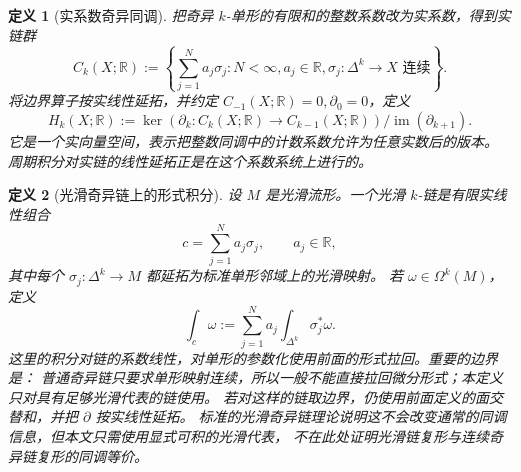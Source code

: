 \documentclass[UTF8,fontset=none,a4paper,11pt]{ctexart}
\theoremstyle{foundation-definition}
\newtheorem{definition}{定义}[section]
\theoremstyle{foundation-theorem}
\theoremstyle{foundation-proposition}
\theoremstyle{foundation-example}
\theoremstyle{foundation-remark}
\theoremstyle{foundation-theorem}
\begin{document}
\begin{definition}[实系数奇异同调]\label{def:real-homology}
把奇异 \(k\)-单形的有限和的整数系数改为实系数，得到实链群
\[
C_k(X;\mathbb R):=\left\{\sum_{j=1}^{N}a_j\sigma_j:
N<\infty, a_j\in\mathbb R, \sigma_j:\Delta^k\to X\text{ 连续}\right\}.
\]
将边界算子按实线性延拓，并约定 \(C_{-1}(X;\mathbb R)=0,\partial_0=0\)，定义
\[
H_k(X;\mathbb R):=\ker(\partial_k:C_k(X;\mathbb R)\to C_{k-1}(X;\mathbb R))
\big/\operatorname{im}(\partial_{k+1}).
\]
它是一个实向量空间，表示把整数同调中的计数系数允许为任意实数后的版本。
周期积分对实链的线性延拓正是在这个系数系统上进行的。
\end{definition}

\begin{definition}[光滑奇异链上的形式积分]\label{def:smooth-chain-integral}
设 \(M\) 是光滑流形。一个光滑 \(k\)-链是有限实线性组合
\[
c=\sum_{j=1}^{N}a_j\sigma_j,
\qquad a_j\in\mathbb R,
\]
其中每个 \(\sigma_j:\Delta^k\to M\) 都延拓为标准单形邻域上的光滑映射。
若 \(\omega\in\Omega^k(M)\)，定义
\[
\int_c\omega:=\sum_{j=1}^{N}a_j\int_{\Delta^k}\sigma_j^*\omega.
\]
这里的积分对链的系数线性，对单形的参数化使用前面的形式拉回。重要的边界是：
普通奇异链只要求单形映射连续，所以一般不能直接拉回微分形式；本定义只对具有足够光滑代表的链使用。
若对这样的链取边界，仍使用前面定义的面交替和，并把 \(\partial\) 按实线性延拓。
标准的光滑奇异链理论说明这不会改变通常的同调信息，但本文只需使用显式可积的光滑代表，
不在此处证明光滑链复形与连续奇异链复形的同调等价。
\end{definition}
\end{document}
